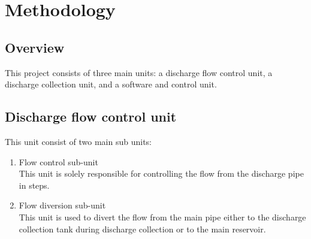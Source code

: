 \section{Methodology}
\subsection{Overview}
This project consists of three main units: a discharge flow control unit, a discharge collection  unit, and a software and control unit. 
\subsection{Discharge flow control unit}
This unit consist of two main sub units:
\begin{enumerate}
    \item Flow control sub-unit\\
    This unit is solely responsible for controlling the flow from the discharge pipe in steps.
    \item Flow diversion sub-unit\\
    This unit is used to divert the flow from the main pipe either to the discharge collection tank during discharge collection or to the main reservoir.
\end{enumerate}
\par
